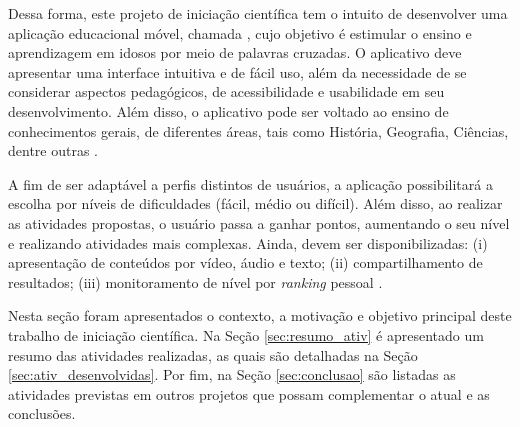 
Dessa forma, este projeto de iniciação científica tem o intuito de desenvolver uma aplicação educacional móvel, chamada \crossword, cujo objetivo é estimular o ensino e aprendizagem em idosos por meio de palavras cruzadas. O aplicativo deve apresentar uma interface intuitiva e de fácil uso, além da necessidade de se considerar aspectos pedagógicos, de acessibilidade e usabilidade em seu desenvolvimento. Além disso, o aplicativo pode ser voltado ao ensino de conhecimentos gerais, de diferentes áreas, tais como História, Geografia, Ciências, dentre outras \citep{oliveira2018crossword}. 

A fim de ser adaptável a perfis distintos de usuários, a aplicação possibilitará a escolha por níveis de dificuldades (fácil, médio ou difícil). Além disso, ao realizar as atividades propostas, o usuário passa a ganhar pontos, aumentando o seu nível e realizando atividades mais complexas. Ainda, devem ser disponibilizadas: (i) apresentação de conteúdos por vídeo, áudio e texto; (ii) compartilhamento de resultados; (iii) monitoramento de nível por \textit{ranking} pessoal \citep{oliveira2018crossword}. 

Nesta seção foram apresentados o contexto, a motivação e objetivo principal deste trabalho de iniciação científica. Na Seção \ref{sec:resumo_ativ} é apresentado um resumo das atividades realizadas, as quais são detalhadas na Seção \ref{sec:ativ_desenvolvidas}. Por fim, na Seção \ref{sec:conclusao} são listadas as atividades previstas em outros projetos que possam complementar o atual e as conclusões.
